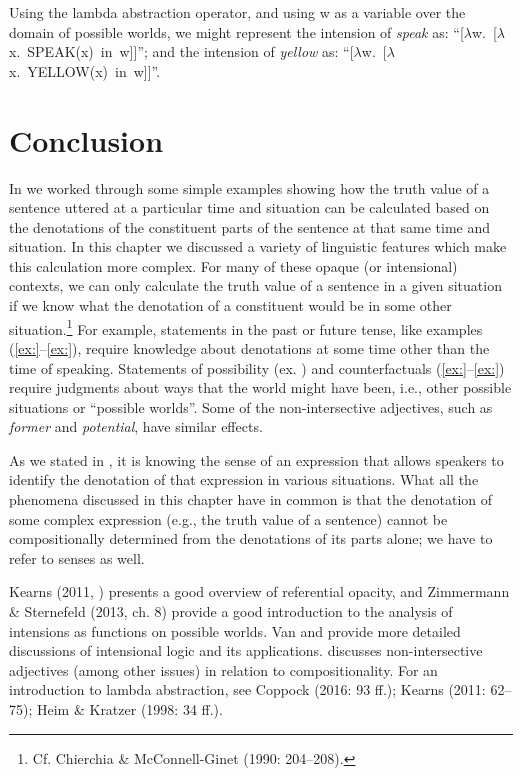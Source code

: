 Using the lambda abstraction operator, and using w as a variable over the domain of possible worlds, we might represent the intension of \textit{speak} as: “[$\lambda $w.~[$\lambda $x.~SPEAK(x)~in~w]]”; and the intension of \textit{yellow} as: “[$\lambda $w.~[$\lambda $x.~YELLOW(x)~in~w]]”.


\section{Conclusion}\label{sec:} %

In  we worked through some simple examples showing how the truth value of a sentence uttered at a particular time and situation can be calculated based on the denotations of the constituent parts of the sentence at that same time and situation. In this chapter we discussed a variety of linguistic features which make this calculation more complex. For many of these opaque (or intensional) contexts, we can only calculate the truth value of a sentence in a given situation if we know what the denotation of a constituent would be in some other situation.\footnote{Cf. Chierchia \& McConnell-Ginet (1990: 204–208).} For example, statements in the past or future tense, like examples (\ref{ex:}--\ref{ex:}), require knowledge about denotations at some time other than the time of speaking. Statements of possibility (ex. ) and counterfactuals (\ref{ex:}--\ref{ex:}) require judgments about ways that the world might have been, i.e., other possible situations or “possible worlds”. Some of the non-intersective adjectives, such as \textit{former} and \textit{potential}, have similar effects.



As we stated in , it is knowing the sense of an expression that allows speakers to identify the denotation of that expression in various situations. What all the phenomena discussed in this chapter have in common is that the denotation of some complex expression (e.g., the truth value of a sentence) cannot be compositionally determined from the denotations of its parts alone; we have to refer to senses as well.



\furtherreading



Kearns (2011, ) presents a good overview of referential opacity, and Zimmermann \& Sternefeld (2013, ch. 8) provide a good introduction to the analysis of intensions as functions on possible worlds. Van \citet{Benthem1988} and \citet{Gamut1991b} provide more detailed discussions of intensional logic and its applications. \citet{Partee1995} discusses non-intersective adjectives (among other issues) in relation to compositionality. For an introduction to lambda abstraction, see Coppock (2016: 93 ff.); Kearns (2011: 62–75); Heim \& Kratzer (1998: 34 ff.).


